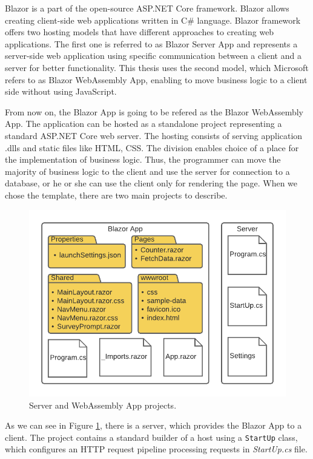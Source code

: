 Blazor is a part of the open-source ASP.NET Core framework.
Blazor allows creating client-side web applications written in C\# language.
Blazor framework offers two hosting models \cite{online:hostingModels} that have different approaches to creating web applications. 
The first one is referred to as Blazor Server App and represents a server-side web application using specific communication between a client and a server for better functionality.
This thesis uses the second model, which Microsoft refers to as Blazor WebAssembly App, enabling to move business logic to a client side without using JavaScript.
\par
From now on, the Blazor App is going to be refered as the Blazor WebAssembly App.
The application can be hosted as a standalone project representing a standard ASP.NET Core web server.
The hosting consists of serving application .dlls and static files like HTML, CSS.
The division enables choice of a place for the implementation of business logic.
Thus, the programmer can move the majority of business logic to the client and use the server for connection to a database, or he or she can use the client only for rendering the page.
When we chose the template, there are two main projects to describe.
\par
\begin{figure}\centering
\includegraphics{./img/ProjectStructure}
\caption{Server and WebAssembly App projects.}
\label{img04:projects}
\end{figure} 
\par
As we can see in Figure \ref{img04:projects}, there is a server, which provides the Blazor App to a client.
The project contains a standard builder of a host using a \texttt{StartUp} class, which configures an HTTP request pipeline processing requests in \textit{StartUp.cs} file.

